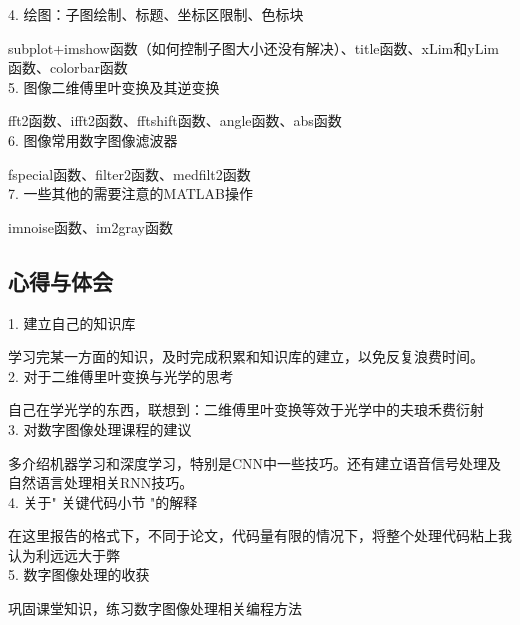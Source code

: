 \documentclass[UTF8]{article} %
\begin{document}
	4. 绘图：子图绘制、标题、坐标区限制、色标块
	
	subplot+imshow函数（如何控制子图大小还没有解决）、title函数、xLim和yLim函数、colorbar函数\\
	
	5. 图像二维傅里叶变换及其逆变换
	
	fft2函数、ifft2函数、fftshift函数、angle函数、abs函数\\
	
	6. 图像常用数字图像滤波器
	
	fspecial函数、filter2函数、medfilt2函数\\
	
	7. 一些其他的需要注意的MATLAB操作
	
	imnoise函数、im2gray函数\\
	
	\subsection{心得与体会}
	1. 建立自己的知识库
	
	学习完某一方面的知识，及时完成积累和知识库的建立，以免反复浪费时间。\\
	
	2. 对于二维傅里叶变换与光学的思考
	
	自己在学光学的东西，联想到：二维傅里叶变换等效于光学中的夫琅禾费衍射\\
	
	3. 对数字图像处理课程的建议
	
	多介绍机器学习和深度学习，特别是CNN中一些技巧。还有建立语音信号处理及自然语言处理相关RNN技巧。\\
	
	4. 关于" 关键代码小节 "的解释

	在这里报告的格式下，不同于论文，代码量有限的情况下，将整个处理代码粘上我认为利远远大于弊\\
	
	5.  数字图像处理的收获
	
	巩固课堂知识，练习数字图像处理相关编程方法\\
\end{document}
